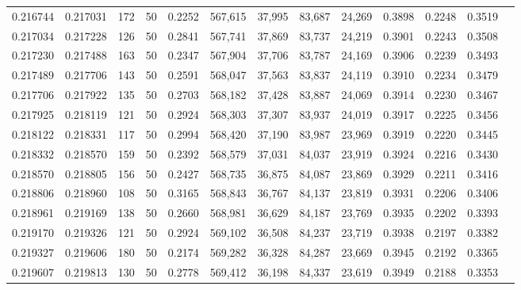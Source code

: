 \begin{tabular}{rrrrrrrrrrrrr}
0.216744 & 0.217031 &   172 &  50 &                                     0.2252 & 567,615 &  37,995 &  83,687 &  24,269 & 0.3898 & 0.2248 & 0.3519 \\
0.217034 & 0.217228 &   126 &  50 &                                     0.2841 & 567,741 &  37,869 &  83,737 &  24,219 & 0.3901 & 0.2243 & 0.3508 \\
0.217230 & 0.217488 &   163 &  50 &                                     0.2347 & 567,904 &  37,706 &  83,787 &  24,169 & 0.3906 & 0.2239 & 0.3493 \\
0.217489 & 0.217706 &   143 &  50 &                                     0.2591 & 568,047 &  37,563 &  83,837 &  24,119 & 0.3910 & 0.2234 & 0.3479 \\
0.217706 & 0.217922 &   135 &  50 &                                     0.2703 & 568,182 &  37,428 &  83,887 &  24,069 & 0.3914 & 0.2230 & 0.3467 \\
0.217925 & 0.218119 &   121 &  50 &                                     0.2924 & 568,303 &  37,307 &  83,937 &  24,019 & 0.3917 & 0.2225 & 0.3456 \\
0.218122 & 0.218331 &   117 &  50 &                                     0.2994 & 568,420 &  37,190 &  83,987 &  23,969 & 0.3919 & 0.2220 & 0.3445 \\
0.218332 & 0.218570 &   159 &  50 &                                     0.2392 & 568,579 &  37,031 &  84,037 &  23,919 & 0.3924 & 0.2216 & 0.3430 \\
0.218570 & 0.218805 &   156 &  50 &                                     0.2427 & 568,735 &  36,875 &  84,087 &  23,869 & 0.3929 & 0.2211 & 0.3416 \\
0.218806 & 0.218960 &   108 &  50 &                                     0.3165 & 568,843 &  36,767 &  84,137 &  23,819 & 0.3931 & 0.2206 & 0.3406 \\
0.218961 & 0.219169 &   138 &  50 &                                     0.2660 & 568,981 &  36,629 &  84,187 &  23,769 & 0.3935 & 0.2202 & 0.3393 \\
0.219170 & 0.219326 &   121 &  50 &                                     0.2924 & 569,102 &  36,508 &  84,237 &  23,719 & 0.3938 & 0.2197 & 0.3382 \\
0.219327 & 0.219606 &   180 &  50 &                                     0.2174 & 569,282 &  36,328 &  84,287 &  23,669 & 0.3945 & 0.2192 & 0.3365 \\
0.219607 & 0.219813 &   130 &  50 &                                     0.2778 & 569,412 &  36,198 &  84,337 &  23,619 & 0.3949 & 0.2188 & 0.3353 \\

\end{tabular}
